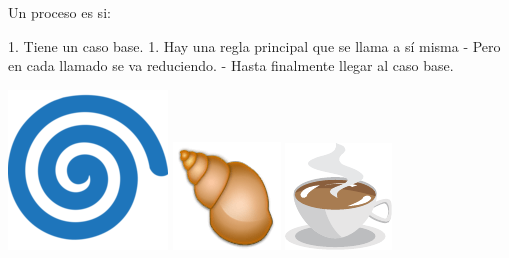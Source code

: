 \bgnblockdefinition
\flushleft \vspace{-2ex} Un proceso es  si:
\vspace{1ex}

1. Tiene un caso base.
1. Hay una regla principal que se llama a sí misma
    - \normalsize \vspace{.4ex} Pero en cada llamado se va reduciendo.
    - Hasta finalmente llegar al caso base.

\vspace{.5ex}
\trmblockdefinition

\vfill

\bgncolumns
{}
\centering
\includegraphics[width=.6\textwidth,valign=t]{img/spiral.png}
\centering
\includegraphics[width=.6\textwidth,valign=t]{img/samsung-shell.png}
\centering
\includegraphics[width=.6\textwidth,valign=t]{img/coffee_v10_2615.pdf}
\trmcolumns

